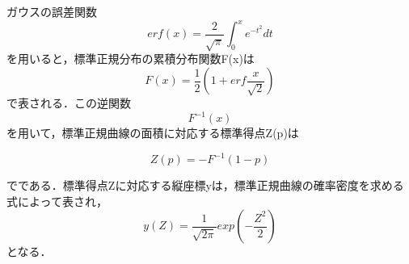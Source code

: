 \documentclass[shuuron]{kuee}
\begin{document}
ガウスの誤差関数
\begin{equation}
  erf(x) = \frac{2}{\sqrt{\pi}}\int_0^x e^{-t^2} dt
\end{equation}
を用いると，標準正規分布の累積分布関数F(x)は
\begin{equation}
  F(x) = \frac{1}{2}(1+erf\frac{x}{\sqrt{2}})
\end{equation}
で表される．この逆関数\begin{equation}F^{-1}(x)\end{equation}を用いて，標準正規曲線の面積に対応する標準得点Z(p)は


\begin{equation}
  Z(p) = -F^{-1}(1-p)
\end{equation}

でである．標準得点Zに対応する縦座標yは，標準正規曲線の確率密度を求める式によって表され，
\begin{equation}
  y(Z)=\frac{1}{\sqrt{2\pi}}exp(-\frac{Z^2}{2})
\end{equation}
となる．
%
%
%
%
%

\end{document}
